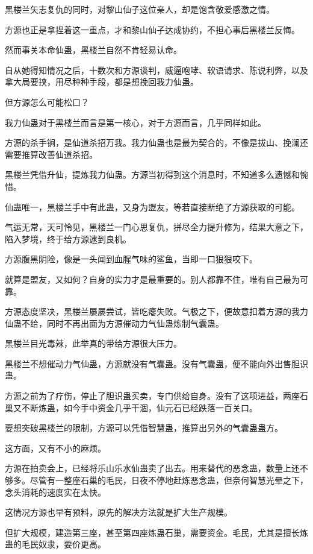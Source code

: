 \begin{this_body}
黑楼兰矢志复仇的同时，对黎山仙子这位亲人，却是饱含敬爱感激之情。

方源也正是拿捏着这一重点，才和黎山仙子达成协约，不担心事后黑楼兰反悔。

然而事关本命仙蛊，黑楼兰自然不肯轻易认命。

自从她得知情况之后，十数次和方源谈判，威逼咆哮、软语请求、陈说利弊，以及拿大局要挟，用尽种种手段，都是想挽回我力仙蛊。

但方源怎么可能松口？

我力仙蛊对于黑楼兰而言是第一核心，对于方源而言，几乎同样如此。

方源的杀手锏，是仙道杀招万我。我力仙蛊也是最为契合的，不像是拔山、挽澜还需要推算改善仙道杀招。

黑楼兰凭借升仙，提炼我力仙蛊。方源当初得到这个消息时，不知道多么遗憾和惋惜。

仙蛊唯一，黑楼兰手中有此蛊，又身为盟友，等若直接断绝了方源获取的可能。

气运无常，天可怜见，黑楼兰一门心思复仇，拼尽全力提升修为，结果大意之下，陷入梦境，终于给方源逮到良机。

方源腹黑阴险，像是一头闻到血腥气味的鲨鱼，当即一口狠狠咬下。

就算是盟友，又如何？自身的实力才是最重要的。别人都靠不住，唯有自己最为可靠。

方源态度坚决，黑楼兰屡屡尝试，皆吃瘪失败。气极之下，便故意扣着方源的我力仙蛊不给，同时不再出面为方源催动力气仙蛊炼制气囊蛊。

黑楼兰目光毒辣，此举真的带给方源很大压力。

黑楼兰不想催动力气仙蛊，方源就没有气囊蛊。没有气囊蛊，便不能向外出售胆识蛊。

方源之前为了疗伤，停止了胆识蛊买卖，专门供给自身。没有了这项进益，两座石巢又不断炼蛊，如今手中资金几乎干涸，仙元石已经跌落一百关口。

要想突破黑楼兰的限制，方源可以凭借智慧蛊，推算出另外的气囊蛊蛊方。

这方面，又有不小的麻烦。

方源在拍卖会上，已经将乐山乐水仙蛊卖了出去。用来替代的恶念蛊，数量上还不够多。尽管有一整座石巢的毛民，日夜不停地赶炼恶念蛊，但奈何智慧光晕之下，念头消耗的速度实在太快。

这情况方源也早有预料，原先的解决方法就是扩大生产规模。

但扩大规模，建造第三座，甚至第四座炼蛊石巢，需要资金。毛民，尤其是擅长炼蛊的毛民奴隶，要价更高。


\end{this_body}
